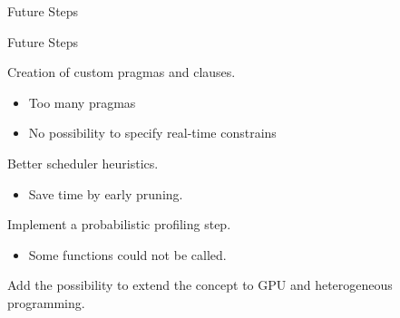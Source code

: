 \documentclass[xcolor=dvipsnames]{beamer}
\begin{document}
\begin{section}{Future Steps}



\begin{frame}{\hskip 0.3cm Future Steps}



 Creation of custom pragmas and clauses.

\begin{itemize}

\item Too many pragmas 

\item No possibility to specify real-time constrains

\end{itemize}

  Better scheduler heuristics.

\begin{itemize}

\item Save time by early pruning.

\end{itemize}

 Implement a probabilistic profiling step.

\begin{itemize}

\item Some functions could not be called.

\end{itemize}

 Add the possibility to extend the concept to GPU and heterogeneous programming.




\end{frame}












\end{section}
\end{document}
